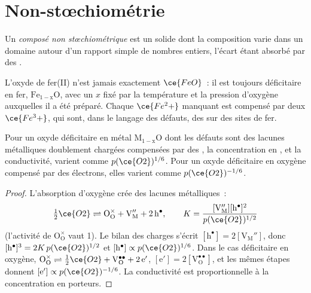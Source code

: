 \section{Non-stœchiométrie}

\begin{definition}\label{def:b3:solid-state:non-stoichiometric}
Un \emph{composé non stœchiométrique} est un
solide dont la composition varie dans un domaine autour d'un rapport simple
de nombres entiers, l'écart étant absorbé par des .
\end{definition}

L'oxyde de fer(II) n'est jamais exactement $\ce{FeO}$~: il est toujours déficitaire en fer,
$\mathrm{Fe_{1-x}O}$, avec un $x$ fixé par la température et la pression d'oxygène auxquelles il a été préparé. Chaque $\ce{Fe^2+}$ manquant est compensé par deux
$\ce{Fe^3+}$, qui sont, dans le langage des défauts, des  sur des sites de fer.

\begin{proposition}\label{prop:b3:solid-state:brouwer}
Pour un oxyde déficitaire en métal $\mathrm{M_{1-x}O}$ dont les défauts sont des lacunes métalliques doublement
chargées compensées par des , la concentration en , et la
conductivité, varient comme
$p(\ce{O2})^{1/6}$. Pour un oxyde déficitaire en oxygène compensé par des électrons, elles varient comme
$p(\ce{O2})^{-1/6}$.
\end{proposition}

\begin{proof}
L'absorption d'oxygène crée des lacunes métalliques~:
\[
  \tfrac12\ce{O2} \rightleftharpoons \mathrm{O_O^{\times} + V_M'' + 2\,h^{\bullet}}, \qquad K = \frac{[\mathrm{V_M''}][\mathrm h^\bullet]^2}{p(\ce{O2})^{1/2}}
\]
(l'activité de $\mathrm{O_O^{\times}}$ vaut 1). Le
bilan des charges s'écrit $[\mathrm h^\bullet] = 2[\mathrm{V_M''}]$, donc $[\mathrm h^\bullet]^3 = 2K\,p(\ce{O2})^{1/2}$ et $[\mathrm h^\bullet] \propto p(\ce{O2})^{1/6}$. Dans le
cas déficitaire en oxygène, $\mathrm{O_O^{\times}} \rightleftharpoons \tfrac12\ce{O2} + \mathrm{V_O^{\bullet\bullet} + 2\,e'}$, $[\mathrm e'] = 2[\mathrm{V_O^{\bullet\bullet}}]$, et les mêmes étapes donnent $[\mathrm e'] \propto p(\ce{O2})^{-1/6}$.
La conductivité est proportionnelle à la concentration en porteurs.
\end{proof}

